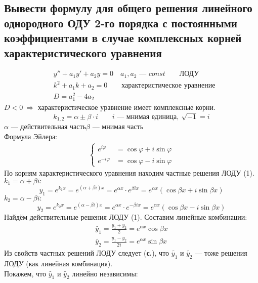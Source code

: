 \subsection{Вывести формулу для общего решения линейного однородного ОДУ 2-го порядка с постоянными коэффициентами в случае комплексных корней характеристического уравнения}

\begin{align*}
    &\boxed{y'' + a_1 y' + a_2 y = 0}\quad a_1, a_2 \text{ --- } const\qquad \text{ЛОДУ} \tag{1} \\
    &\boxed{k^2 + a_1k + a_2 = 0}\qquad \text{характеристическое уравнение}\\
    &D = a_1^2 - 4a_2
\end{align*}
$D< 0\ \Rightarrow$ характеристическое уравнение имеет комплексные корни.
\[
    k_{1,2} = \alpha \pm \beta \cdot i\qquad i \text{ --- мнимая единица},\ \sqrt{-1} = i
\]
$\alpha$ --- действительная часть\qquad $\beta$ --- мнимая часть \\
Формула Эйлера:
\begin{gather*}
    \left\{ \begin{aligned}
        e^{i\varphi} &= \cos \varphi + i \sin \varphi \\
        e^{-i \varphi} &= \cos \varphi - i \sin \varphi
    \end{aligned} \right.
\end{gather*}
По корням характеристического уравнения находим частные решения ЛОДУ (1). \\
$k_1 = \alpha + \beta i\colon$
\[
    y_1 = e^{k_1x} = e^{(\alpha + \beta i)x} = e^{\alpha x}\cdot e^{\beta i x} = \boxed{e^{\alpha x} \left(\cos \beta x + i \sin \beta x\right)}
\]
$k_2 = \alpha - \beta i\colon$
\[
    y_2 = e^{k_2x} = e^{(\alpha - \beta i)x} = e^{\alpha x} \cdot e^{-\beta i x} = \boxed{e^{\alpha x} \left(\cos \beta x - i \sin \beta x\right)}
\]
Найдём действительные решения ЛОДУ (1). Составим линейные комбинации:
\begin{align*}
    \widetilde{y_1} = \frac{y_1 + y_2}{2} = e^{\alpha x} \cos \beta x \\
    \widetilde{y_2} = \frac{y_1 - y_2}{2i} = e^{\alpha x} \sin \beta x
\end{align*}
Из свойств частных решений ЛОДУ следует (\textbf{с.\pageref{sec: свойства частных решений ЛОДУ n-го порядка}}), что $\widetilde{y_1}$ и $\widetilde{y_2}$ --- тоже решения ЛОДУ (как линейная комбинация). \\
Покажем, что $\widetilde{y_1}$ и $\widetilde{y_2}$ линейно независимы:
